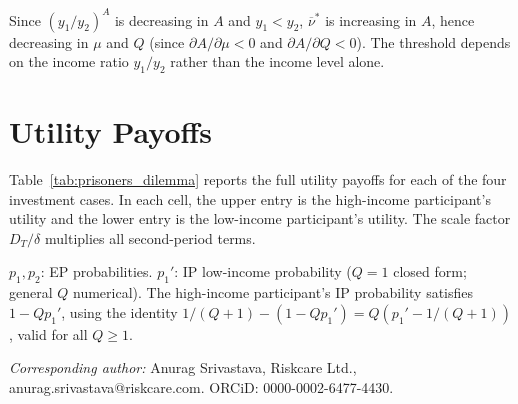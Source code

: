 \documentclass[
    oneside,
    fontsize=10pt,leqno]{article}
\begin{document}
Since $(y_{1}/y_{2})^{A}$ is decreasing in $A$ and $y_{1}<y_{2}$,
$\overline{\nu}^{*}$ is increasing in $A$, hence decreasing in $\mu$
and $Q$ (since $\partial A/\partial\mu<0$ and $\partial A/\partial Q<0$).
The threshold depends on the income ratio $y_{1}/y_{2}$ rather than
the income level alone.

\section{Utility Payoffs} \label{sec:appendix_payoffs}

Table~\ref{tab:prisoners_dilemma} reports the full utility payoffs
for each of the four investment cases. In each cell, the upper entry
is the high-income participant's utility and the lower entry is the
low-income participant's utility. The scale factor $D_{T}/\delta$
multiplies all second-period terms.


\begin{table}[H]
\centering
\caption{\label{tab:prisoners_dilemma}Utility payoffs (scale factor $D_{T}/\delta$
multiplies all second-period terms)}
\smallskip
{}
\begin{minipage}{\textwidth}
\smallskip
{\footnotesize $p_{1},p_{2}$: EP probabilities. $p_{1}'$: IP low-income probability
($Q=1$ closed form; general $Q$ numerical). The high-income participant's IP
probability satisfies $1-Qp_{1}'$, using the identity
$1/(Q+1)-(1-Qp_{1}')=Q(p_{1}'-1/(Q+1))$, valid for all $Q\geq1$.}
\end{minipage}
\end{table}



\bigskip
\noindent\textit{Corresponding author:} Anurag Srivastava, Riskcare Ltd., anurag.srivastava@riskcare.com. ORCiD: 0000-0002-6477-4430.
\end{document}
